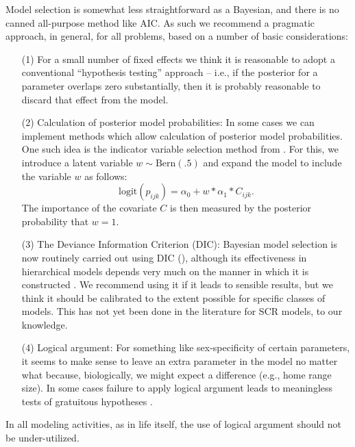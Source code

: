 Model selection is somewhat less straightforward as a Bayesian, and
there is no canned all-purpose method like AIC. As such we
recommend a pragmatic approach, in general, for all problems,
based on a number of basic considerations:
\begin{itemize}
\item[(1)] For a small number of fixed effects we think it is
  reasonable to adopt a conventional ``hypothesis testing'' approach
  -- i.e., if the posterior for a parameter overlaps zero
  substantially, then it is probably reasonable to discard that
  effect from the model.
\item[(2)] Calculation of posterior model probabilities: In some cases
  we can implement methods which allow calculation of posterior model
  probabilities. One such idea is the indicator variable selection
  method from \citet{kuo_mallick:1998}.  For this, we introduce a latent
  variable $w \sim \mbox{Bern}(.5)$ and expand the model to include
  the variable $w$ as follows:
\[
 \mbox{logit}(p_{ijk}) = \alpha_{0} + w*\alpha_{1}*C_{ijk}.
\]
The importance of the covariate $C$ is then measured by the posterior
probability that $w=1$.
\item[(3)] The Deviance Information Criterion (DIC): Bayesian model
  selection is now routinely carried out using DIC (\citep{spiegelhalter_etal:2002}),
  although its
  effectiveness in hierarchical models depends very much on the manner
  in which it is constructed \citep{millar:2009}.  We recommend using
  it if it leads to sensible results, but we think it should be
  calibrated to the extent possible for specific classes of models.
  This has not yet been done in the literature for SCR models, to our knowledge.
\item[(4)] Logical argument: For something like sex-specificity of
  certain parameters, it seems to make sense to leave an extra
  parameter in the model no matter what because, biologically, we might
 expect a difference (e.g., home range size).
In some cases failure to apply logical argument leads to
  meaningless tests of gratuitous hypotheses \citep{johnson:1999}.
\end{itemize}
In all modeling activities, as in life itself, the use of logical argument should not be under-utilized.

